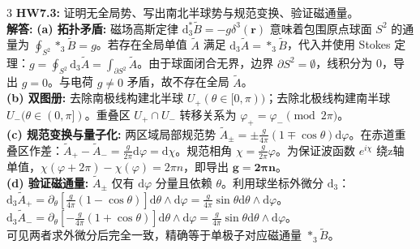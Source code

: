\documentclass[9pt,a4paper]{article} %
\newcommand{\p}{\partial}
\newcommand{\diff}{\mathrm{d}}
\newcommand{\mbf}[1]{\mathbf{#1}}
\begin{document}
\begin{multicols*}{3}
\vspace{0.5ex}
\noindent\textbf{HW7.3:} 证明无全局势、写出南北半球势与规范变换、验证磁通量。\\
\textbf{解答:} 
\textbf{(a) 拓扑矛盾:} 磁场高斯定律 $\diff_3^* \tilde{B} = -g\delta^3(\mbf{r})$ 意味着包围原点球面 $S^2$ 的通量为 $\oint_{S^2} *_3 \tilde{B} = g$。若存在全局单值 $\tilde{A}$ 满足 $\diff_3\tilde{A} = *_3\tilde{B}$，代入并使用 Stokes 定理：$g = \oint_{S^2} \diff_3 \tilde{A} = \int_{\p S^2} \tilde{A}$。由于球面闭合无界，边界 $\p S^2 = \emptyset$，线积分为 0，导出 $g=0$。与电荷 $g\neq0$ 矛盾，故不存在全局 $\tilde{A}$。\\
\textbf{(b) 双图册:} 去除南极线构建北半球 $U_+ (\theta \in [0,\pi))$；去除北极线构建南半球 $U_- (\theta \in (0,\pi])$。重叠区 $U_+ \cap U_-$ 转移关系为 $\varphi_+ = \varphi_- \pmod{2\pi}$。\\
\textbf{(c) 规范变换与量子化:} 两区域局部规范势 $\tilde{A}_{\pm} = \pm \frac{g}{4\pi}(1 \mp \cos\theta)\diff\varphi$。在赤道重叠区作差：$\tilde{A}_+ - \tilde{A}_- = \frac{g}{2\pi}\diff\varphi = \diff\chi$。规范相角 $\chi = \frac{g}{2\pi}\varphi$。为保证波函数 $e^{i\chi}$ 绕z轴单值，$\chi(\varphi+2\pi) - \chi(\varphi) = 2\pi n$，即导出 $\mathbf{g = 2\pi n}$。\\
\textbf{(d) 验证磁通量:} $\tilde{A}_{\pm}$ 仅有 $\diff\varphi$ 分量且依赖 $\theta$。利用球坐标外微分 $\diff_3$：\\
$\diff_3 \tilde{A}_+ = \p_\theta \left[ \frac{g}{4\pi}(1-\cos\theta) \right] \diff\theta \wedge \diff\varphi = \frac{g}{4\pi}\sin\theta \diff\theta \wedge \diff\varphi$。\\
$\diff_3 \tilde{A}_- = \p_\theta \left[ -\frac{g}{4\pi}(1+\cos\theta) \right] \diff\theta \wedge \diff\varphi = \frac{g}{4\pi}\sin\theta \diff\theta \wedge \diff\varphi$。\\
可见两者求外微分后完全一致，精确等于单极子对应磁通量 $*_3\tilde{B}$。

\end{multicols*}
\end{document}
